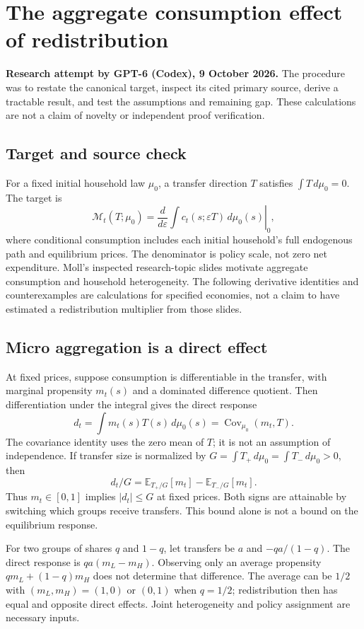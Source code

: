 \documentclass[11pt]{article}
\newcommand{\E}{\mathbb E}
\newcommand{\Cov}{\operatorname{Cov}}
\begin{document}
\section*{The aggregate consumption effect of redistribution}
\textbf{Research attempt by GPT-6 (Codex), 9 October 2026.}
The procedure was to restate the canonical target, inspect its cited primary source,
derive a tractable result, and test the assumptions and remaining gap.
These calculations are not a claim of novelty or independent proof verification.

\subsection*{Target and source check}
For a fixed initial household law $\mu_0$, a transfer direction $T$ satisfies
$\int T\,d\mu_0=0$. The target is
\[
 \mathcal M_t(T;\mu_0)=
 \left.\frac{d}{d\varepsilon}\int c_t(s;\varepsilon T)\,d\mu_0(s)
 \right|_{0},
\]
where conditional consumption includes each initial household's full
endogenous path and equilibrium prices. The denominator is policy scale,
not zero net expenditure. Moll's inspected research-topic slides motivate
aggregate consumption and household heterogeneity. The following derivative
identities and counterexamples are calculations for specified economies,
not a claim to have estimated a redistribution multiplier from those slides.

\subsection*{Micro aggregation is a direct effect}
At fixed prices, suppose consumption is differentiable in the transfer,
with marginal propensity $m_t(s)$ and a dominated difference quotient.
Then differentiation under the integral gives the direct response
\[
 d_t=\int m_t(s)T(s)\,d\mu_0(s)=\Cov_{\mu_0}(m_t,T).
\]
The covariance identity uses the zero mean of $T$; it is not an assumption
of independence. If transfer size is normalized by
$G=\int T_+\,d\mu_0=\int T_-\,d\mu_0>0$, then
\[
 d_t/G=\E_{T_+/G}[m_t]-\E_{T_-/G}[m_t].
\]
Thus $m_t\in[0,1]$ implies $|d_t|\leq G$ at fixed prices. Both signs are
attainable by switching which groups receive transfers. This bound alone
is not a bound on the equilibrium response.

For two groups of shares $q$ and $1-q$, let transfers be $a$ and
$-qa/(1-q)$. The direct response is
$qa(m_L-m_H)$. Observing only an average propensity
$q m_L+(1-q)m_H$ does not determine that difference. The average can be
$1/2$ with $(m_L,m_H)=(1,0)$ or $(0,1)$ when $q=1/2$; redistribution
then has equal and opposite direct effects. Joint heterogeneity and policy
assignment are necessary inputs.
\end{document}
